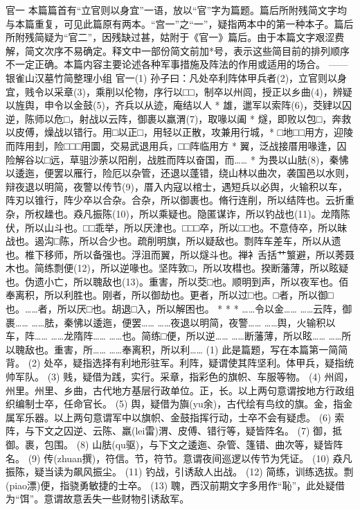 \documentclass[12pt,UTF8]{ctexbook}
\begin{document}
官一
本篇篇首有“立官则以身宜”一语，放以“官”字为篇题。篇后所附残简文字均与本篇重复，可见此篇原有两本。“宫一”之“一”，疑指两本中的第一种本子。篇后所附残简疑为“官二”，因残缺过甚，姑附于《官一》篇后。由于本篇文字艰涩费解，简文次序不易确定。释文中一部份简文前加*号，表示这些简目前的排列顺序不一定正确。本篇内容主要论述各种军事措施及阵法的作用或适用的场合。
—— 银雀山汉墓竹简整理小组
官一(1)
孙子曰：凡处卒利阵体甲兵者(2)，立官则以身宜，贱令以采章(3)，乘削以伦物，序行以□□，制卒以州闾，授正以乡曲(4)，辨疑以旌舆，申令以金鼓(5)，齐兵以从迹，庵结以人 * 雄，邋军以索阵(6)，茭肄以囚逆，陈师以危□，射战以云阵，御裹以羸渭(7)，取喙以阖 * 燧，即败以包□，奔救以皮傅，燥战以错行。用□以正□，用轻以正散，攻兼用行城，* □地□□用方，迎陵而阵用刲，险□□□用圜，交易武退用兵，□□阵临用方 * 翼，泛战接厝用喙逢，囚险解谷以□远，草驵沙荼以阳削，战胜而阵以奋国，而…… * 为畏以山胠(8)，秦怫以逶迤，便罢以雁行，险厄以杂管，还退以蓬错，绕山林以曲次，袭国邑以水则，辩夜退以明简，夜警以传节(9)，厝入内寇以棺士，遇短兵以必舆，火输积以车，阵刃以锥行，阵少卒以合杂。合杂，所以御裹也。脩行连削，所以结阵也。云折重杂，所权趮也。猋凡振陈(10)，所以乘疑也。隐匿谋诈，所以钓战也(11)。龙隋陈伏，所以山斗也。□□乖举，所以厌津也。□□□卒，所以□□也。不意侍卒，所以昧战也。遏沟□陈，所以合少也。疏削明旗，所以疑敌也。剽阵{车差}车，所以从遗也。椎下移师，所以备强也。浮沮而翼，所以燧斗也。禅{衤舌}括{艹瀪}避，所以莠{聂木}也。简练剽便(12)，所以逆喙也。坚阵敦□，所以攻槥也。揆断藩薄，所以眩疑也。伪遗小亡，所以聭敌也(13)。重害，所以茭□也。顺明到声，所以夜军也。佰奉离积，所以利胜也。刚者，所以御劫也。更者，所以过□也。□者，所以御□也。……者，所以厌□也。胡退□入，所以解困也。
* * *
……令以金……
……云阵，御裹……
……胠，秦怫以逶迤，便罢……
……夜退以明简，夜警……
……舆，火输积以车，阵……
……龙隋阵……
……也。简练□便，所以逆……
……断藩薄，所以眩……
……所以聭敌也。重害，所……
……奉离积，所以利……
(1) 此是篇题，写在本篇第一简简背。
(2) 处卒，疑指选择有利地形驻军。利阵，疑谓使其阵坚利。体甲兵，疑指统帅军队。
(3) 贱，疑借为践，实行。采章，指彩色的旗帜、车服等物。
(4) 州闾，州里。州里、乡曲，古代地方基层行政单位。正，长。以上两句意谓按地方行政组织编制士卒，任命官长。
(5) 舆，疑借为旟(yu余)，古代绘有鸟纹的旗。金，指金属军乐器。以上两句意谓军中以旗帜、金鼓指挥行动，士卒不会有疑虑。
(6) 索阵，与下文之囚逆、云陈、羸(lei雷)渭、皮傅、错行等，疑皆阵名。
(7) 御，抵御。裹，包围。
(8) 山胠(qu驱)，与下文之逶迤、杂管、篷错、曲次等，疑皆阵名。
(9) 传(zhuan撰)，符信。节，符节。意谓夜间巡逻以传节为凭证。
(10) 猋凡振陈，疑当读为飙风振尘。
(11) 钓战，引诱敌人出战。
(12) 简练，训练选拔。剽(piao漂)便，指骁勇敏捷的士卒。
(13) 聭，西汉前期文字多用作“恥”，此处疑借为“饵”。意谓故意丢失一些财物引诱敌军。
\end{document}
